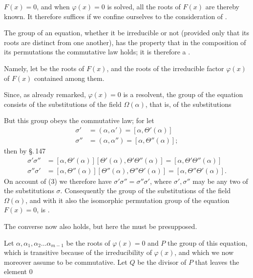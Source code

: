 $F(x) = 0$, and when $\varphi(x) = 0$ is solved, all the roots
of $F(x)$ are thereby known. It therefore suffices if we confine
ourselves to the consideration of .

\quad The  group of an  equation, whether it
be irreducible or not (provided only that its roots are distinct
from one another), has the property that in the composition
of its permutations the commutative law holds; it is
therefore a .

\quad Namely, let
be the roots of $F(x)$, and
the roots of the irreducible factor $\varphi(x)$ of $F(x)$
contained among them.

\quad Since, as already remarked, $\varphi(x) = 0$ is a  resolvent,
the group of the equation consists of the substitutions
of the field $\Omega(\alpha)$, that is, of the substitutions

\quad But this group obeys the commutative law; for
let
\[
\begin{aligned}
\sigma' &= (\alpha, \alpha') = [\alpha, \Theta'(\alpha)]\\
\sigma'' &= (\alpha, \alpha'') = [\alpha, \Theta''(\alpha)];
\end{aligned}
\]
then by \S.\,147
\[
\begin{aligned}
\sigma'\sigma'' &= [\alpha, \Theta'(\alpha)][\Theta'(\alpha), \Theta'\Theta''(\alpha)] = [\alpha, \Theta'\Theta''(\alpha)]\\
\sigma''\sigma' &= [\alpha, \Theta''(\alpha)][\Theta''(\alpha), \Theta''\Theta'(\alpha)] = [\alpha, \Theta''\Theta'(\alpha)].
\end{aligned}
\]
On account of (3) we therefore have $\sigma'\sigma'' = \sigma''\sigma'$, where $\sigma', \sigma''$ may be any
two of the substitutions $\sigma$. Consequently the group of the
substitutions of the field $\Omega(\alpha)$, and with it also the isomorphic
permutation group of the equation $F(x) = 0$, is .

\quad The converse now also holds, but here the 
must be presupposed.

\quad {}

\quad Let $\alpha, \alpha_1, \alpha_2 \ldots \alpha_{m-1}$ be the roots of $\varphi(x) = 0$ and
$P$ the group of this equation, which is transitive because of the irreducibility of
$\varphi(x)$, and which we now moreover assume to be commutative.
Let $Q$ be the divisor of $P$ that leaves the element $0$
